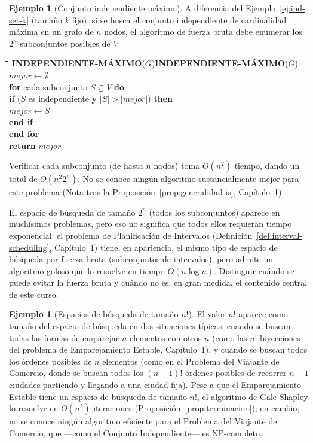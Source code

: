 \documentclass[12pt, spanish, oneside, openany]{book}
\newcommand{\pl}[1]{\makebox[1.6em][r]{\texttt{\footnotesize #1}}\hspace{0.9em}}
\newenvironment{pseudo}[1]{%
  \begin{center}%
  \begin{mdframed}[style=pseudobox]%
  \small
  \begin{tabbing}%
  \hspace{2.5em}\=\hspace{1.5em}\=\hspace{1.5em}\=\hspace{1.5em}\=\hspace{1.5em}\=\kill
  \def\pseudotitulo{#1}\ifx\pseudotitulo\empty\else#1\\[3pt]\fi}%
  {\end{tabbing}\end{mdframed}\end{center}}
\theoremstyle{uprightplain}
\theoremstyle{definition}
\newtheorem{ejemplo}[teorema]{Ejemplo}
\theoremstyle{remark}
\theoremstyle{definition}
\begin{document}
\begin{ejemplo}[Conjunto independiente máximo]
\label{ej:ind-set-max}
A diferencia del Ejemplo~\ref{ej:ind-set-k} (tamaño $k$ fijo), si se busca el conjunto independiente de cardinalidad máxima en un grafo de $n$ nodos, el algoritmo de fuerza bruta debe enumerar los $2^n$ subconjuntos posibles de $V$:
\begin{pseudo}{\textbf{INDEPENDIENTE-MÁXIMO}($G$)}
\pl{1}\> $\mathit{mejor} \leftarrow \emptyset$\\
\pl{2}\> \textbf{for} cada subconjunto $S \subseteq V$ \textbf{do}\\
\pl{3}\>\> \textbf{if} ($S$ es independiente \textbf{y} $|S| > |\mathit{mejor}|$) \textbf{then}\\
\pl{4}\>\>\> $\mathit{mejor} \leftarrow S$\\
\pl{5}\>\> \textbf{end if}\\
\pl{6}\> \textbf{end for}\\
\pl{7}\> \textbf{return} $\mathit{mejor}$
\end{pseudo}
Verificar cada subconjunto (de hasta $n$ nodos) toma $O(n^2)$ tiempo, dando un total de $O(n^2 2^n)$. No se conoce ningún algoritmo sustancialmente mejor para este problema (Nota tras la Proposición~\ref{prop:generalidad-is}, Capítulo~1).
\end{ejemplo}

El espacio de búsqueda de tamaño $2^n$ (todos los subconjuntos) aparece en muchísimos problemas, pero eso no significa que todos ellos requieran tiempo exponencial: el problema de Planificación de Intervalos (Definición~\ref{def:interval-scheduling}, Capítulo~1) tiene, en apariencia, el mismo tipo de espacio de búsqueda por fuerza bruta (subconjuntos de intervalos), pero admite un algoritmo goloso que lo resuelve en tiempo $O(n\log n)$. Distinguir cuándo se puede evitar la fuerza bruta y cuándo no es, en gran medida, el contenido central de este curso.

\begin{ejemplo}[Espacios de búsqueda de tamaño $n!$]
\label{ej:factorial}
El valor $n!$ aparece como tamaño del espacio de búsqueda en dos situaciones típicas: cuando se buscan todas las formas de emparejar $n$ elementos con otros $n$ (como las $n!$ biyecciones del problema de Emparejamiento Estable, Capítulo~1), y cuando se buscan todos los órdenes posibles de $n$ elementos (como en el Problema del Viajante de Comercio, donde se buscan todos los $(n-1)!$ órdenes posibles de recorrer $n-1$ ciudades partiendo y llegando a una ciudad fija). Pese a que el Emparejamiento Estable tiene un espacio de búsqueda de tamaño $n!$, el algoritmo de Gale-Shapley lo resuelve en $O(n^2)$ iteraciones (Proposición~\ref{prop:terminacion}); en cambio, no se conoce ningún algoritmo eficiente para el Problema del Viajante de Comercio, que —como el Conjunto Independiente— es NP-completo.
\end{ejemplo}
\end{document}
